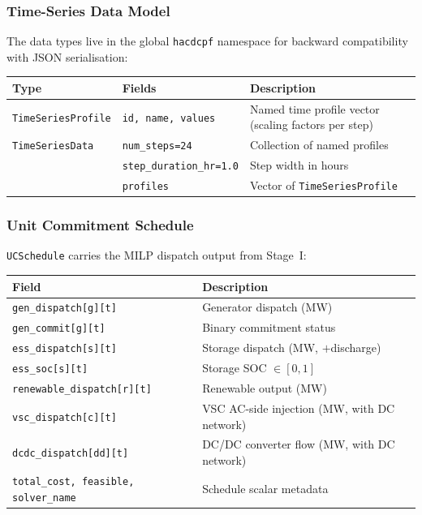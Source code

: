 \subsubsection{Time-Series Data Model}

The data types live in the global \texttt{hacdcpf} namespace for backward
compatibility with JSON serialisation:

\begin{center}
\begin{tabular}{lll}
\hline\hline
\textbf{Type} & \textbf{Fields} & \textbf{Description} \\
\hline
\texttt{TimeSeriesProfile} & \texttt{id, name, values} & Named time profile vector (scaling factors per step) \\
\texttt{TimeSeriesData} & \texttt{num\_steps=24} & Collection of named profiles \\
 & \texttt{step\_duration\_hr=1.0} & Step width in hours \\
 & \texttt{profiles} & Vector of \texttt{TimeSeriesProfile} \\
\hline\hline
\end{tabular}
\end{center}

\subsubsection{Unit Commitment Schedule}

\texttt{UCSchedule} carries the MILP dispatch output from Stage~I:

\begin{center}
\begin{tabular}{ll}
\hline\hline
\textbf{Field} & \textbf{Description} \\
\hline
\texttt{gen\_dispatch[g][t]} & Generator dispatch (MW) \\
\texttt{gen\_commit[g][t]} & Binary commitment status \\
\texttt{ess\_dispatch[s][t]} & Storage dispatch (MW, $+$discharge) \\
\texttt{ess\_soc[s][t]} & Storage SOC $\in [0,1]$ \\
\texttt{renewable\_dispatch[r][t]} & Renewable output (MW) \\
\texttt{vsc\_dispatch[c][t]} & VSC AC-side injection (MW, with DC network) \\
\texttt{dcdc\_dispatch[dd][t]} & DC/DC converter flow (MW, with DC network) \\
\texttt{total\_cost, feasible, solver\_name} & Schedule scalar metadata \\
\hline\hline
\end{tabular}
\end{center}

